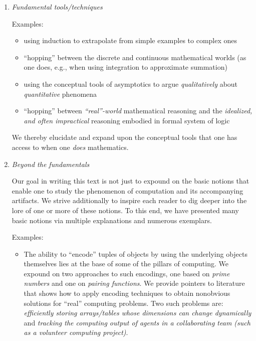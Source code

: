 \begin{enumerate}
\bigskip\item
{\it Fundamental tools/techniques}

\medskip

{\small\sf Examples:}
\begin{itemize}
\item
using induction to extrapolate from simple examples to complex ones
\medskip\item
``hopping'' between the discrete and continuous mathematical worlds (as one does, e.g., when using integration to approximate summation)
\medskip\item
using the conceptual tools of asymptotics to argue {\em qualitatively} about {\em quantitative} phenomena
\medskip\item
``hopping'' between {\em ``real''-world} mathematical reasoning and the {\em idealized, and often impractical} reasoning embodied in formal system of logic
\end{itemize}
We thereby elucidate and expand upon the conceptual tools that one has access to when one {\em does} mathematics.

\medskip\item
{\it Beyond the fundamentals}

\smallskip

Our goal in writing this text is not just to expound on the basic notions that enable one to study the phenomenon of computation and its accompanying artifacts.  We strive additionally to inspire each reader to dig deeper into the lore of one or more of these notions.  To this end, we have presented many basic notions via multiple explanations and numerous exemplars.

\medskip

{\small\sf Examples:}
\begin{itemize}
\item
The ability to ``encode'' tuples of objects by using the underlying objects themselves lies at the base of some of the pillars of computing.  We expound on two approaches to such encodings, one based on {\em prime numbers} and one on {\em pairing functions}.  We provide pointers to literature that shows how to apply encoding techniques to obtain nonobvious solutions for ``real'' computing problems.  Two such problems are: {\em efficiently storing arrays/tables whose dimensions can change dynamically} and {\em tracking the computing output of agents in a collaborating team (such as a volunteer computing project)}.


\end{itemize}
\end{enumerate}
